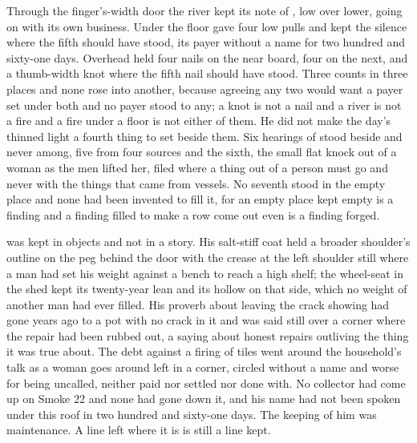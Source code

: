 Through the finger's-width door the river kept its note of , low over lower, going on with its own business. Under the floor  gave four low pulls and kept the silence where the fifth should have stood, its payer without a name for two hundred and sixty-one days. Overhead  held four nails on the near board, four on the next, and a thumb-width knot where the fifth nail should have stood. Three counts in three places and none rose into another, because agreeing any two would want a payer set under both and no payer stood to any; a knot is not a nail and a river is not a fire and a fire under a floor is not either of them. He did not make the day's thinned light a fourth thing to set beside them. Six hearings of  stood beside and never among, five from four sources and the sixth, the small flat knock out of a woman as the men lifted her, filed where a thing out of a person must go and never with the things that came from vessels. No seventh stood in the empty place and none had been invented to fill it, for an empty place kept empty is a finding and a finding filled to make a row come out even is a finding forged.

 was kept in objects and not in a story. His salt-stiff coat held a broader shoulder's outline on the peg behind the door with the crease at the left shoulder still where a man had set his weight against a bench to reach a high shelf; the wheel-seat in the shed kept its twenty-year lean and its hollow on that side, which no weight of another man had ever filled. His proverb about leaving the crack showing had gone years ago to a pot with no crack in it and was said still over a corner where the repair had been rubbed out, a saying about honest repairs outliving the thing it was true about. The debt against a firing of tiles went around the household's talk as a woman goes around  left in a corner, circled without a name and worse for being uncalled, neither paid nor settled nor done with. No collector had come up  on Smoke 22 and none had gone down it, and his name had not been spoken under this roof in two hundred and sixty-one days. The keeping of him was maintenance. A line left where it is is still a line kept.

